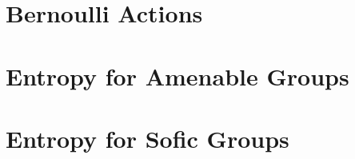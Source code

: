 \documentclass[10pt]{mypackage}
\begin{document}
\RaggedRight
\section{Bernoulli Actions}%

\section{Entropy for Amenable Groups}%

\section{Entropy for Sofic Groups}%
\end{document}
